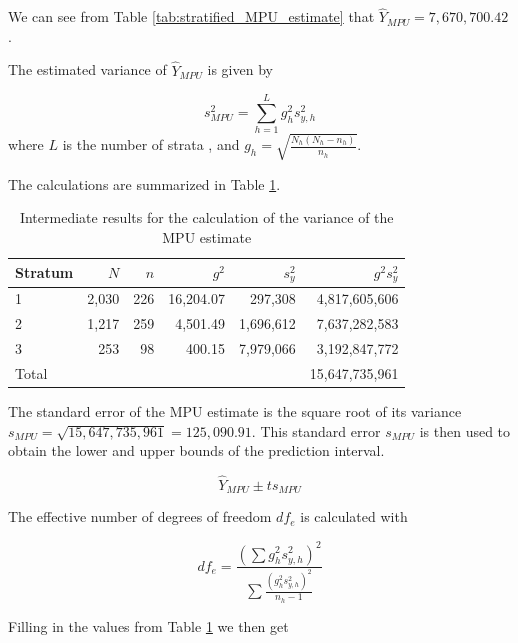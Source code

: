 We can see from Table \ref{tab:stratified_MPU_estimate} that $\hat{Y}_{MPU} = 7,670,700.42$.

\bigskip
The estimated variance of $\hat{Y}_{MPU}$ is given by

\begin{equation}
s^2_{MPU} = \sum_{h = 1}^{L}g_h^2 s_{y,h}^2
\label{eq:estimated_variance_MPU}
\end{equation}
where $L$ is the number of strata , and $g_h = \sqrt{\frac{N_h(N_h - n_h)}{n_h}}$.

\bigskip
The calculations are summarized in Table \ref{tab:intermediate_results_variance}.

\begin{table}[htbp]
\centering
\caption{Intermediate results for the calculation of the variance of the MPU estimate}
\label{tab:intermediate_results_variance}

\begin{tabularx}{\textwidth}{@{}lrrrrr@{}}
\toprule
Stratum &
$N$ &
$n$ &
$g^2$ &
$s_y^2$ &
$g^2 s_y^2$ \\
\midrule
1 & 2,030 & 226 & 16,204.07 &   297,308 &  4,817,605,606 \\
2 & 1,217 & 259 &  4,501.49 & 1,696,612 &  7,637,282,583 \\
3 &   253 &  98 &    400.15 & 7,979,066 &  3,192,847,772 \\
\midrule
Total & & & & & 15,647,735,961 \\
\bottomrule
\end{tabularx}
\end{table}

\bigskip
The standard error of the MPU estimate is the square root of its variance $s_{MPU} = \sqrt{15,647,735,961} = 125,090.91.$ This standard error $s_{MPU}$ is then used to obtain the lower and upper bounds of the prediction interval.

\begin{equation}
\hat{Y}_{MPU} \pm t s_{MPU} 
\label{eq:pred_interval_strat_MPU}
\end{equation}

The effective number of degrees of freedom $df_e$ is calculated with

\begin{equation}
df_e = \frac{(\sum g_h^2 s_{y,h}^2)^2}{\sum \frac{(g_h^2 s_{y,h}^2)^2}{n_h - 1}}
\label{eq:df_effective}
\end{equation}

Filling in the values from Table \ref{tab:intermediate_results_variance} we then get

